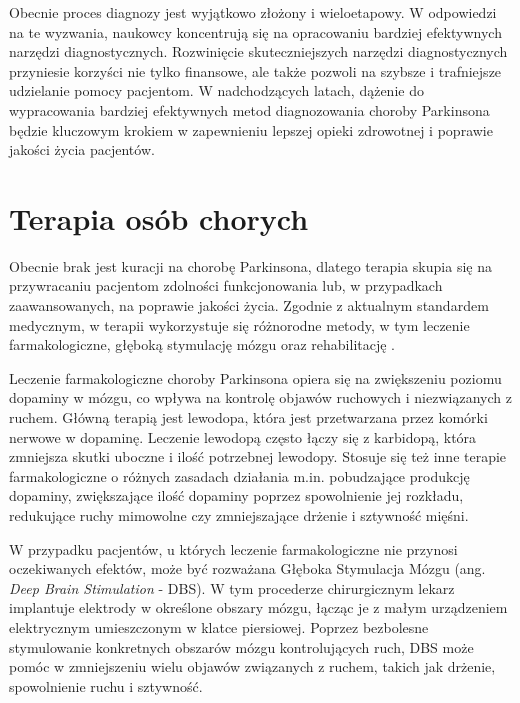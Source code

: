 Obecnie proces diagnozy jest wyjątkowo złożony i wieloetapowy.
W odpowiedzi na te wyzwania, naukowcy koncentrują się na opracowaniu bardziej efektywnych narzędzi diagnostycznych.
Rozwinięcie skuteczniejszych narzędzi diagnostycznych przyniesie korzyści nie tylko finansowe, ale także pozwoli na szybsze i trafniejsze udzielanie pomocy pacjentom.
W nadchodzących latach, dążenie do wypracowania bardziej efektywnych metod diagnozowania choroby Parkinsona będzie kluczowym krokiem w zapewnieniu lepszej opieki zdrowotnej i poprawie jakości życia pacjentów.


\section{Terapia osób chorych}
\label{sec:terapia}
Obecnie brak jest kuracji na chorobę Parkinsona, dlatego terapia skupia się na przywracaniu pacjentom zdolności funkcjonowania
lub, w przypadkach zaawansowanych, na poprawie jakości życia.
Zgodnie z aktualnym standardem medycznym, w terapii wykorzystuje się różnorodne metody, w tym leczenie farmakologiczne, głęboką stymulację mózgu oraz rehabilitację \cite{National_Institute_on_Aging_2022}.

Leczenie farmakologiczne choroby Parkinsona opiera się na zwiększeniu poziomu dopaminy w mózgu, co wpływa na kontrolę objawów
ruchowych i niezwiązanych z ruchem. Główną terapią jest lewodopa, która jest przetwarzana przez komórki nerwowe w dopaminę.
Leczenie lewodopą często łączy się z karbidopą, która zmniejsza skutki uboczne i ilość potrzebnej lewodopy.
Stosuje się też inne terapie farmakologiczne o różnych zasadach działania m.in. pobudzające produkcję dopaminy,
zwiększające ilość dopaminy poprzez spowolnienie jej rozkładu, redukujące ruchy mimowolne czy zmniejszające drżenie i sztywność mięśni.

W przypadku pacjentów, u których leczenie farmakologiczne nie przynosi oczekiwanych efektów, może być rozważana Głęboka Stymulacja Mózgu (ang. \emph{Deep Brain Stimulation} - DBS).
W tym procederze chirurgicznym lekarz implantuje elektrody w określone obszary mózgu, łącząc je z małym urządzeniem elektrycznym umieszczonym w klatce piersiowej.
Poprzez bezbolesne stymulowanie konkretnych obszarów mózgu kontrolujących ruch, DBS może pomóc w zmniejszeniu wielu objawów związanych z ruchem,
takich jak drżenie, spowolnienie ruchu i sztywność.

